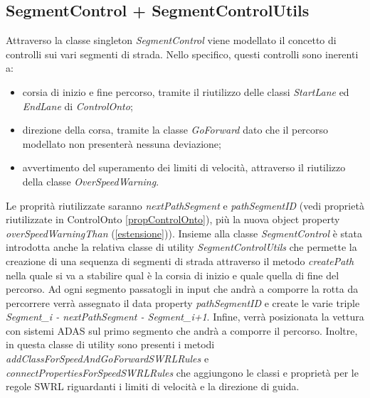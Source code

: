 \subsection{SegmentControl + SegmentControlUtils}
Attraverso la classe singleton \textit{SegmentControl} viene modellato il concetto di controlli sui vari segmenti di strada. Nello specifico, questi controlli sono inerenti a:
\begin{itemize}
\item corsia di inizio e fine percorso, tramite il riutilizzo delle classi \textit{StartLane} ed \textit{EndLane} di \textit{ControlOnto};
\item direzione della corsa, tramite la classe \textit{GoForward} dato che il percorso modellato non presenter\`a nessuna deviazione;
\item avvertimento del superamento dei limiti di velocit\`a, attraverso il riutilizzo della classe \textit{OverSpeedWarning}.
\end{itemize}
Le proprit\`a riutilizzate saranno \textit{nextPathSegment} e \textit{pathSegmentID} (vedi propriet\`a riutilizzate in ControlOnto \ref{propControlOnto}), pi\`u la nuova object property \textit{overSpeedWarningThan} (\ref{estensione})).
Insieme alla classe \textit{SegmentControl} \`e stata introdotta anche la relativa classe di utility \textit{SegmentControlUtils} che permette la creazione di una sequenza di segmenti di strada attraverso il metodo \textit{createPath} nella quale si va a stabilire qual \`e la corsia di inizio e quale quella di fine del percorso.
Ad ogni segmento passatogli in input che andr\`a a comporre la rotta da percorrere verr\`a assegnato il data property \textit{pathSegmentID} e create le varie triple \textit{Segment\_i - nextPathSegment - Segment\_i+1}.
Infine, verr\`a posizionata la vettura con sistemi ADAS sul primo segmento che andr\`a a comporre il percorso.
Inoltre, in questa classe di utility sono presenti i metodi \textit{addClassForSpeedAndGoForwardSWRLRules} e \textit{connectPropertiesForSpeedSWRLRules} che aggiungono le classi e propriet\`a per le regole SWRL riguardanti i limiti di velocit\`a e la direzione di guida.
